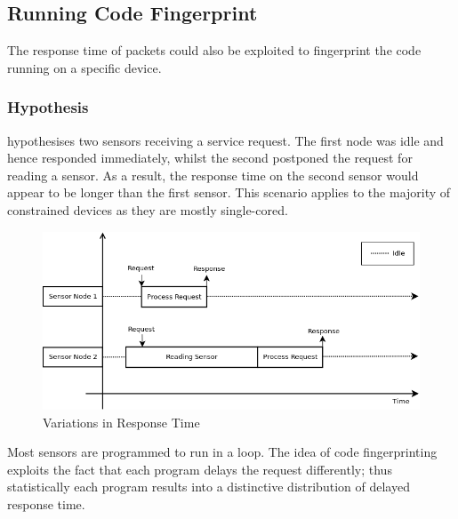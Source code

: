 \subsection{Running Code Fingerprint}
The response time of packets could also be exploited to fingerprint the code running on a specific device. 

\subsubsection{Hypothesis}
 hypothesises two sensors receiving a service request. The first node was idle and hence responded immediately, whilst the second postponed the request for reading a sensor. As a result, the response time on the second sensor would appear to be longer than the first sensor. This scenario applies to the majority of constrained devices as they are mostly single-cored. 

\begin{figure}
	\center
	\includegraphics[width=\textwidth]{fig/PingProbe_Theory.png}
	\caption{Variations in Response Time\label{FingerprintTheory}}
\end{figure}

Most sensors are programmed to run in a loop. The idea of code fingerprinting exploits the fact that each program delays the request differently; thus statistically each program results into a distinctive distribution of delayed response time. 

